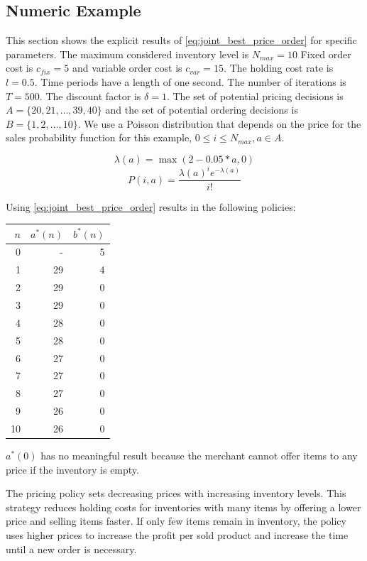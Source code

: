 
\subsection{Numeric Example}
This section shows the explicit results of \cref{eq:joint_best_price_order} for specific parameters.
The maximum considered inventory level is $N_{max} = 10$
Fixed order cost is $c_{fix} = 5$ and variable order cost is $c_{var} = 15$.
The holding cost rate is $l = 0.5$.
Time periods have a length of one second.
The number of iterations is $T = 500$.
The discount factor is $\delta = 1$.
The set of potential pricing decisions is $A = \{20, 21, \ldots, 39, 40\}$ and the set of potential ordering decisions is $B = \{1, 2, \ldots, 10\}$.
We use a Poisson distribution that depends on the price for the sales probability function for this example, $0 \leq i \leq N_{max}, a \in A$.

$$
\lambda(a) = \max(2 - 0.05*a, 0)
$$
$$
P(i, a) = \frac{\lambda(a)^ie^{-\lambda(a)}}{i!}
$$

Using \cref{eq:joint_best_price_order} results in the following policies:

\begin{table}
	\centering
	\begin{tabular}{rrr}
		\toprule
		$n$ & $a^*(n)$ & $b^*(n)$ \\
		\midrule
		0 & - & 5 \\
		1 & 29 & 4 \\
		2 & 29 & 0 \\
		3 & 29 & 0\\
		4 & 28 & 0\\
		5 & 28 & 0\\
		6 & 27 & 0\\
		7 & 27 & 0\\
		8 & 27 & 0\\
		9 & 26 & 0\\
		10 & 26 & 0\\
		\bottomrule
	\end{tabular}
\end{table}

$a^*(0)$ has no meaningful result because the merchant cannot offer items to any price if the inventory is empty.

The pricing policy sets decreasing prices with increasing inventory levels.
This strategy reduces holding costs for inventories with many items by offering a lower price and selling items faster.
If only few items remain in inventory, the policy uses higher prices to increase the profit per sold product and increase the time until a new order is necessary.

